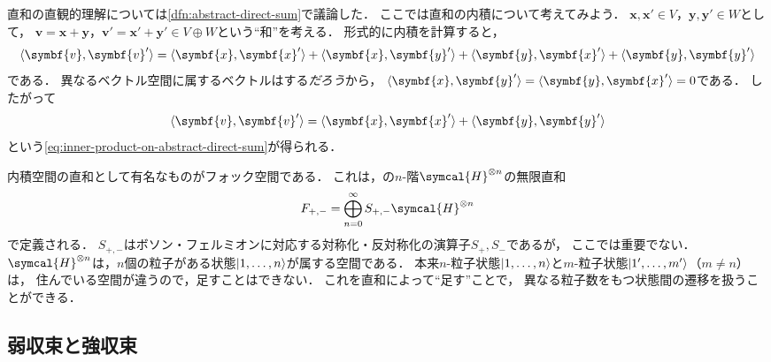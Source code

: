 \documentclass[../sotsu.tex]{subfiles}
\begin{document}
直和の直観的理解については\cref{dfn:abstract-direct-sum}で議論した．
ここでは直和の内積について考えてみよう．
$\symbf{x}, \symbf{x}' \in V$，$\symbf{y}, \symbf{y}' \in W$として，
$\symbf{v} = \symbf{x} + \symbf{y}$，$\symbf{v}' = \symbf{x}' + \symbf{y}' \in V \oplus W$という``和''を考える．
形式的に内積を計算すると，
\begin{equation*}
    \iparen{ \symbf{v}, \symbf{v}' }
        = \iparen{ \symbf{x}, \symbf{x}' }
        + \iparen{ \symbf{x}, \symbf{y}' }
        + \iparen{ \symbf{y}, \symbf{x}' }
        + \iparen{ \symbf{y}, \symbf{y}' }
\end{equation*}
である．
異なるベクトル空間に属するベクトルはする\emph{だろう}から，
$\iparen{\symbf{x}, \symbf{y}'} = \iparen{\symbf{y}, \symbf{x}'} = 0$である．
したがって
\begin{equation*}
    \iparen{ \symbf{v}, \symbf{v}' }
        = \iparen{ \symbf{x}, \symbf{x}' }
        + \iparen{ \symbf{y}, \symbf{y}' }
\end{equation*}
という\cref{eq:inner-product-on-abstract-direct-sum}が得られる．

内積空間の直和として有名なものがフォック空間である．
これは，の$n$-階$\symcal{H}^{\otimes n}$の無限直和
\begin{equation*}
    F_{+,-} = \bigoplus_{n = 0}^{\infty} S_{+,-} \symcal{H}^{\otimes n}
\end{equation*}
で定義される．
$S_{+,-}$はボソン・フェルミオンに対応する対称化・反対称化の演算子$S_+, S_-$であるが，
ここでは重要でない．
$\symcal{H}^{\otimes n}$は，$n$個の粒子がある状態$\lvert1, \dots, n\rangle$が属する空間である．
本来$n$-粒子状態$\lvert1, \dots, n\rangle$と$m$-粒子状態$\lvert1', \dots, m'\rangle$（$m \neq n$）は，
住んでいる空間が違うので，足すことはできない．
これを直和によって``足す''ことで，
異なる粒子数をもつ状態間の遷移を扱うことができる．



\subsection{弱収束と強収束}
\end{document}
